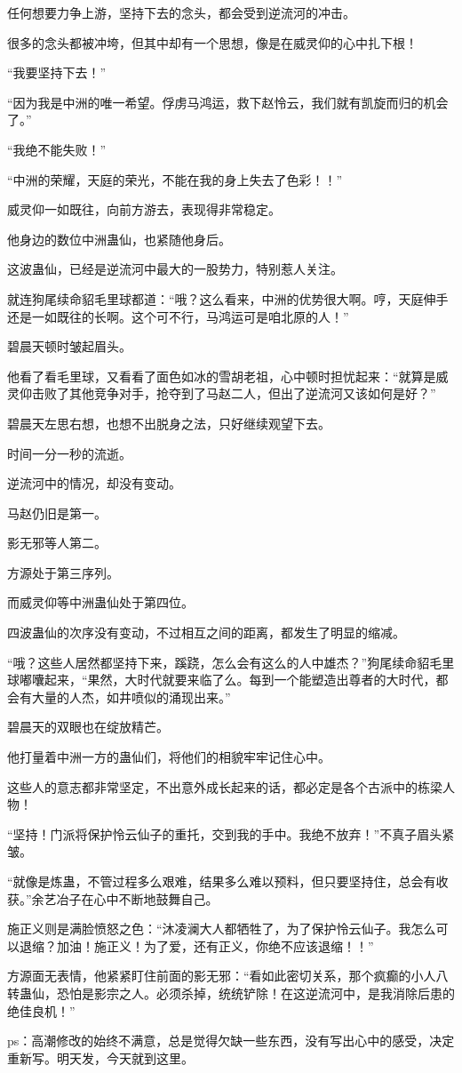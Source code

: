 \begin{this_body}
任何想要力争上游，坚持下去的念头，都会受到逆流河的冲击。

很多的念头都被冲垮，但其中却有一个思想，像是在威灵仰的心中扎下根！

“我要坚持下去！”

“因为我是中洲的唯一希望。俘虏马鸿运，救下赵怜云，我们就有凯旋而归的机会了。”

“我绝不能失败！”

“中洲的荣耀，天庭的荣光，不能在我的身上失去了色彩！！”

威灵仰一如既往，向前方游去，表现得非常稳定。

他身边的数位中洲蛊仙，也紧随他身后。

这波蛊仙，已经是逆流河中最大的一股势力，特别惹人关注。

就连狗尾续命貂毛里球都道：“哦？这么看来，中洲的优势很大啊。哼，天庭伸手还是一如既往的长啊。这个可不行，马鸿运可是咱北原的人！”

碧晨天顿时皱起眉头。

他看了看毛里球，又看看了面色如冰的雪胡老祖，心中顿时担忧起来：“就算是威灵仰击败了其他竞争对手，抢夺到了马赵二人，但出了逆流河又该如何是好？”

碧晨天左思右想，也想不出脱身之法，只好继续观望下去。

时间一分一秒的流逝。

逆流河中的情况，却没有变动。

马赵仍旧是第一。

影无邪等人第二。

方源处于第三序列。

而威灵仰等中洲蛊仙处于第四位。

四波蛊仙的次序没有变动，不过相互之间的距离，都发生了明显的缩减。

“哦？这些人居然都坚持下来，蹊跷，怎么会有这么的人中雄杰？”狗尾续命貂毛里球嘟囔起来，“果然，大时代就要来临了么。每到一个能塑造出尊者的大时代，都会有大量的人杰，如井喷似的涌现出来。”

碧晨天的双眼也在绽放精芒。

他打量着中洲一方的蛊仙们，将他们的相貌牢牢记住心中。

这些人的意志都非常坚定，不出意外成长起来的话，都必定是各个古派中的栋梁人物！

“坚持！门派将保护怜云仙子的重托，交到我的手中。我绝不放弃！”不真子眉头紧皱。

“就像是炼蛊，不管过程多么艰难，结果多么难以预料，但只要坚持住，总会有收获。”余艺冶子在心中不断地鼓舞自己。

施正义则是满脸愤怒之色：“沐凌澜大人都牺牲了，为了保护怜云仙子。我怎么可以退缩？加油！施正义！为了爱，还有正义，你绝不应该退缩！！”

方源面无表情，他紧紧盯住前面的影无邪：“看如此密切关系，那个疯癫的小人八转蛊仙，恐怕是影宗之人。必须杀掉，统统铲除！在这逆流河中，是我消除后患的绝佳良机！”

ps：高潮修改的始终不满意，总是觉得欠缺一些东西，没有写出心中的感受，决定重新写。明天发，今天就到这里。

\end{this_body}

